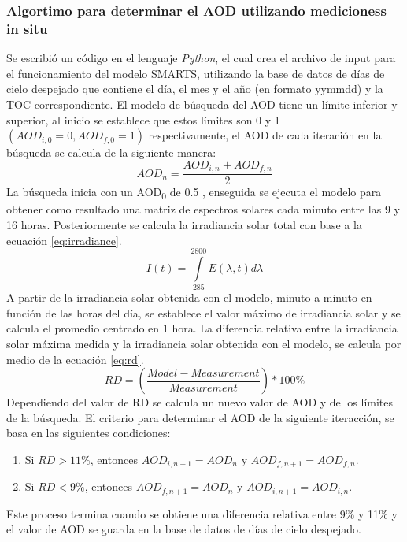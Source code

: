 \subsubsection{Algortimo para determinar el AOD utilizando medicioness in situ}
Se escribió un código en el lenguaje \textit{Python}, el cual crea el archivo de input para el funcionamiento del modelo SMARTS, utilizando la base de datos de días de cielo despejado que contiene el día, el mes y el año (en formato yymmdd) y la TOC correspondiente. El modelo de búsqueda del AOD tiene un límite inferior y superior, al inicio se establece que estos límites son 0 y 1 $(AOD_{i,0}=0, AOD_{f,0}=1)$ respectivamente, el AOD de cada iteración en la búsqueda se calcula de la siguiente manera:
\begin{equation*}
    AOD_{n}=\frac{AOD_{i,n}+AOD_{f,n}}{2}
\end{equation*}
La búsqueda inicia con un AOD\textsubscript{0} de 0.5 , enseguida se ejecuta el modelo para obtener como resultado una matriz de espectros solares cada minuto entre las 9 y 16 horas. Posteriormente se calcula la irradiancia solar total con base a la ecuación \ref{eq:irradiance}.
\begin{equation}
    I(t) = \int\limits_{285}^{2800} E(\lambda,t) d\lambda
    \label{eq:irradiance}
\end{equation}
A partir de la irradiancia solar obtenida con el modelo, minuto a minuto en función de las horas del día, se establece el valor máximo de irradiancia solar y se calcula el promedio centrado en 1 hora. La diferencia relativa entre la irradiancia solar máxima medida y la irradiancia solar obtenida con el modelo, se calcula por medio de la ecuación \ref{eq:rd}.
\begin{equation}
    RD = \left(\frac{Model-Measurement}{Measurement}\right)*100\%
    \label{eq:rd}
\end{equation}
Dependiendo del valor de RD se calcula un nuevo valor de AOD y de los límites de la búsqueda. El criterio para determinar el AOD de la siguiente iteracción, se basa en las siguientes condiciones:
\begin{enumerate}
    \item Si $RD>11\%$, entonces $AOD_{i,n+1}=AOD_{n}$ y $AOD_{f,n+1}=AOD_{f,n}$.
    \item Si $RD<9\%$, entonces $AOD_{f,n+1}=AOD_{n}$ y $AOD_{i,n+1}=AOD_{i,n}$.
\end{enumerate}
Este proceso termina cuando se obtiene una diferencia relativa entre 9\% y 11\% y el valor de AOD se guarda en la base de datos de días de cielo despejado.